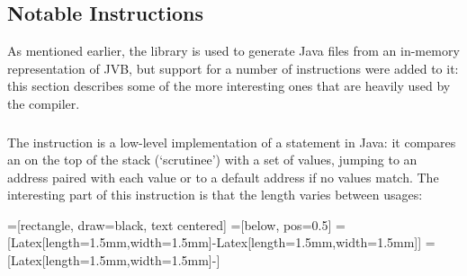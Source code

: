 \documentclass[dissertation.tex]{subfiles}
\begin{document}
{{\begin{itemize}
{        }
        \end{itemize}

    }
    \subsection{Notable Instructions}
    {

        As mentioned earlier, the  library is used to generate Java  files from
        an in-memory representation of JVB, but support for a number of instructions were added to it: this section
        describes some of the more interesting ones that are heavily used by the compiler.
        
        \subsubsection{}
        {
            
            The  instruction is a low-level implementation of a  statement in
            Java: it compares an  on the top of the stack (`scrutinee') with a set of values, jumping to
            an address paired with each value or to a default address if no values match. The interesting part of
            this instruction is that the length varies between usages:

            =[rectangle, draw=black, text centered]
            =[below, pos=0.5]
            =[{Latex[length=1.5mm,width=1.5mm]}-{Latex[length=1.5mm,width=1.5mm]}]
            =[{Latex[length=1.5mm,width=1.5mm]}-]

            \begin{figure}[h]
\end{figure}}}}
\end{document}
